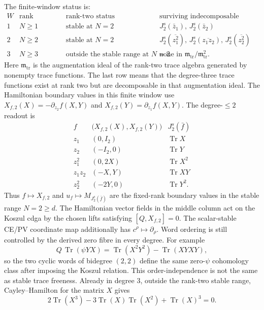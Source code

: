 \documentclass[11pt]{memoir}
\begin{document}
The finite-window status is:
\[
\begin{array}{c|c|c|c}
  W & \text{rank condition} & \text{rank-two status}
    & \text{surviving indecomposable traces}\\ \hline
  1 & N\ge1 & \text{stable at }N=2
    & J_2^s(\bar z_1),\,J_2^s(\bar z_2)\\
  2 & N\ge2 & \text{stable at }N=2
    & J_2^s(\overline{z_1^2}),\,J_2^s(\overline{z_1z_2}),\,
      J_2^s(\overline{z_2^2})\\
  3 & N\ge3 & \text{outside the stable range at }N=2
    & \text{none in } \mathfrak m_{\mathrm{tr}}/\mathfrak m_{\mathrm{tr}}^2 .
\end{array}
\]
Here \(\mathfrak m_{\mathrm{tr}}\) is the augmentation ideal of the
rank-two trace algebra generated by nonempty trace functions.  The last
row means that the degree-three trace functions exist at rank two but
are decomposable in that augmentation ideal.
The Hamiltonian boundary values in this finite window use
\(X_{f,2}(X)=-\partial_{z_2}f(X,Y)\) and
\(X_{f,2}(Y)=\partial_{z_1}f(X,Y)\).  The degree-\(\leq2\) readout is
\[
\begin{array}{c|c|c}
  f & \bigl(X_{f,2}(X),X_{f,2}(Y)\bigr) & J_2^s(\bar f)\\ \hline
  z_1 & (0,I_2) & \operatorname{Tr}X\\
  z_2 & (-I_2,0) & \operatorname{Tr}Y\\
  z_1^2 & (0,2X) & \operatorname{Tr}X^2\\
  z_1z_2 & (-X,Y) & \operatorname{Tr}XY\\
  z_2^2 & (-2Y,0) & \operatorname{Tr}Y^2.
\end{array}
\]
Thus \(f\mapsto X_{f,2}\) and \(u_f\mapsto M_{J_2^s(\bar f)}\) are the
fixed-rank boundary values in the stable range \(N=2\ge d\).  The
Hamiltonian vector fields in the middle column act on the Koszul cdga
by the chosen lifts satisfying \([Q,X_{f,2}]=0\).  The scalar-stable
CE/PV coordinate map additionally has \(c^\rho\mapsto\partial_\rho\).
Word ordering is still controlled by the derived zero fibre in every
degree.  For example
\[
  Q\,\operatorname{Tr}(\psi YX)
   =
  \operatorname{Tr}(X^2Y^2)-\operatorname{Tr}(XYXY),
\]
so the two cyclic words of bidegree \((2,2)\) define the same
zero-\(\psi\) cohomology class after imposing the Koszul relation.
This order-independence is not the same as stable trace freeness.
Already in degree \(3\), outside the rank-two stable range,
Cayley--Hamilton for the matrix \(X\) gives
\[
  2\operatorname{Tr}(X^3)
  -3\operatorname{Tr}(X)\operatorname{Tr}(X^2)
  +\operatorname{Tr}(X)^3=0.
\]
\end{document}

